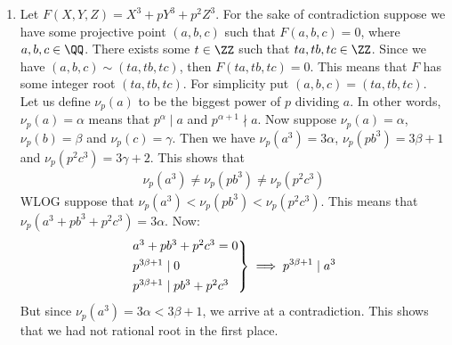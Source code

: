 \begin{enumerate}[label=]
    \item
        Let $F(X, Y, Z) = X^3 + pY^3 + p^2 Z^3$. For the sake of contradiction suppose we have some projective point $(a, b, c)$ such that $F(a, b, c) = 0$, where $a, b, c \in \QQ$. There exists some $t \in \ZZ$ such that $ta, tb, tc \in \ZZ$. Since we have $(a, b, c) \sim (ta, tb, tc)$, then $F(ta, tb, tc) = 0$. This means that $F$ has some integer root $(ta, tb, tc)$. For simplicity put $(a, b, c) = (ta, tb, tc)$. Let us define $\nu_p(a)$ to be the biggest power of $p$ dividing $a$. In other words, $\nu_p(a) = \alpha$ means that $p^\alpha \mid a$ and $p^{\alpha + 1} \nmid a$. Now suppose $\nu_p(a) = \alpha$, $\nu_p(b) = \beta$ and $\nu_p(c) = \gamma$. Then we have $\nu_p(a^3) = 3\alpha$, $\nu_p(pb^3) = 3 \beta + 1$ and $\nu_p(p^2 c^3) = 3 \gamma + 2$. This shows that 
        \begin{gather*}
            \nu_p(a^3) \ne \nu_p(pb^3) \ne \nu_p(p^2 c^3)
        \end{gather*}
        WLOG suppose that $\nu_p(a^3) < \nu_p(pb^3) < \nu_p(p^2c^3)$. This means that $\nu_p(a^3 + pb^3 + p^2 c^3) = 3 \alpha$. Now:
        \begin{gather*}
            \begin{rcases}
                a^3 + pb^3 + p^2 c^3 = 0 \\
                p^{3 \beta + 1} \mid 0 \\
                p^{3 \beta + 1} \mid p b^3 + p^2 c^3 
            \end{rcases}
            \implies p^{3 \beta + 1} \mid a^3
        \end{gather*}
        But since $\nu_p(a^3) = 3 \alpha < 3 \beta + 1$, we arrive at a contradiction. This shows that we had not rational root in the first place.
\end{enumerate}